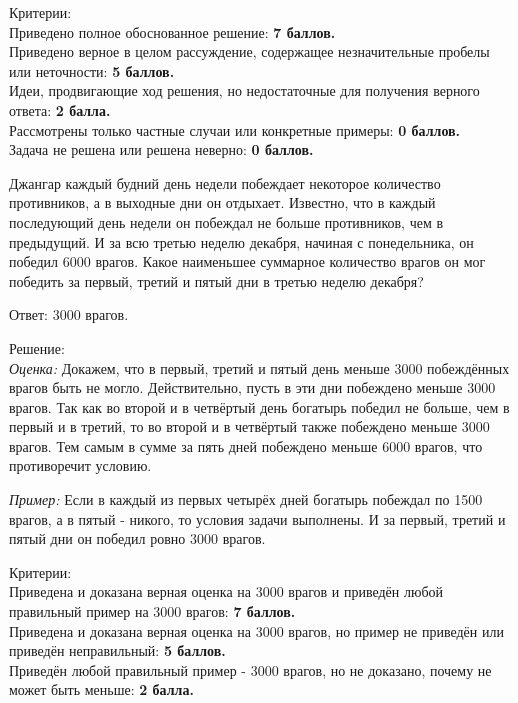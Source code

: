 \newpage

\hspace{3mm}

Критерии:\\
Приведено полное обоснованное решение: \textbf{7 баллов.}\\
Приведено верное в целом рассуждение, содержащее незначительные пробелы или неточности: \textbf{5 баллов.}\\
Идеи, продвигающие ход решения, но недостаточные для получения верного ответа: \textbf{2 балла.}\\
Рассмотрены только частные случаи или конкретные примеры: \textbf{0 баллов.}\\
Задача не решена или решена неверно: \textbf{0 баллов.}

Джангар каждый будний день недели побеждает некоторое количество противников, а в выходные дни он отдыхает. Известно, что в каждый последующий день недели он побеждал не больше противников, чем в предыдущий. И за всю третью неделю декабря, начиная с понедельника, он победил 6000 врагов. Какое наименьшее суммарное количество врагов он мог победить за первый, третий и пятый дни в третью неделю декабря?

\hspace{3mm}

Ответ: 3000 врагов.

Решение:\\
\textit{Оценка:} Докажем, что в первый, третий и пятый день меньше 3000 побеждённых врагов быть не могло. 
Действительно,  пусть в эти дни побеждено меньше 3000 врагов. Так как во второй и в четвёртый день богатырь победил не больше, чем в первый и в третий, то во второй и в четвёртый также побеждено меньше 3000 врагов. Тем самым в сумме за пять дней побеждено меньше 6000 врагов, что противоречит условию. 

\textit{Пример:} Если в каждый из первых четырёх дней богатырь побеждал по 1500 врагов, а в пятый - никого, то условия задачи выполнены. И за первый, третий и пятый дни он победил ровно 3000 врагов.

\hspace{3mm}

Критерии:\\
Приведена и доказана верная оценка на 3000 врагов и приведён любой правильный пример на 3000 врагов: \textbf{7 баллов.}\\
Приведена и доказана верная оценка на 3000 врагов, но пример не приведён или приведён неправильный: \textbf{5 баллов.}\\
Приведён любой правильный пример - 3000 врагов, но не доказано, почему не может быть меньше: \textbf{2 балла.}

